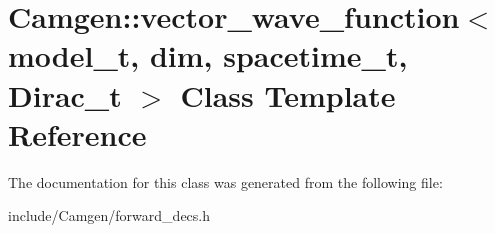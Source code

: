 \hypertarget{a00584}{}\section{Camgen\+:\+:vector\+\_\+wave\+\_\+function$<$ model\+\_\+t, dim, spacetime\+\_\+t, Dirac\+\_\+t $>$ Class Template Reference}
\label{a00584}


The documentation for this class was generated from the following file\+:\begin{DoxyCompactItemize}
\item 
include/\+Camgen/forward\+\_\+decs.\+h\end{DoxyCompactItemize}
